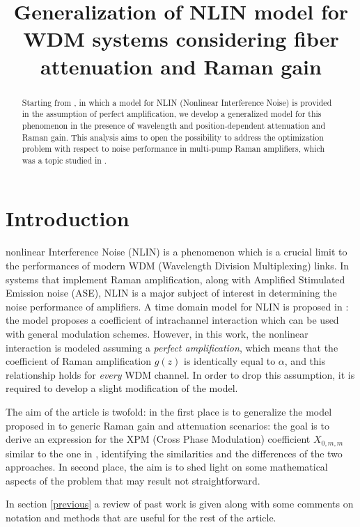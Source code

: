\documentclass[10pt, lettersize, journal, onecolumn]{IEEEtran}
\title{Generalization of NLIN model for WDM systems considering fiber attenuation and Raman gain}
\begin{document}
\maketitle


\begin{abstract}
Starting from \cite{Dar_2013}, in which a model for NLIN (Nonlinear Interference Noise) is provided in the assumption of perfect amplification, we develop a generalized model for this phenomenon in the presence of wavelength and position-dependent attenuation and Raman gain. This analysis aims to open the possibility to address the optimization problem with respect to noise performance in multi-pump Raman amplifiers, which was a topic studied in \cite{Marcon_2021}.
\end{abstract}
\section{Introduction}
nonlinear Interference Noise (NLIN) is a phenomenon which is a crucial limit to the performances of modern WDM (Wavelength Division Multiplexing) links. In systems that implement Raman amplification, along with Amplified Stimulated Emission noise (ASE), NLIN is a major subject of interest in determining the noise performance of amplifiers. A time domain model for NLIN is proposed in \cite{Dar_2013}: the model proposes a coefficient of intrachannel interaction which can be used with general modulation schemes. However, in this work, the nonlinear interaction is modeled assuming a \textit{perfect amplification}, which means that the coefficient of Raman amplification $g(z)$ is identically equal to $\alpha$, and this relationship holds for \textit{every} WDM channel.
In order to drop this assumption, it is required to develop a slight modification of the model.

The aim of the article is twofold: in the first place is to generalize the model proposed in \cite{Dar_2013} to generic Raman gain and attenuation scenarios: the goal is to derive an expression for the XPM (Cross Phase Modulation) coefficient $X_{0, m, m}$ similar to the one in \cite{Dar_2013}, identifying the similarities and the differences of the two approaches.
In second place, the aim is to shed light on some mathematical aspects of the problem that may result not straightforward.

In section \ref{previous} a review of past work is given along with some comments on notation and methods that are useful for the rest of the article.
\end{document}
